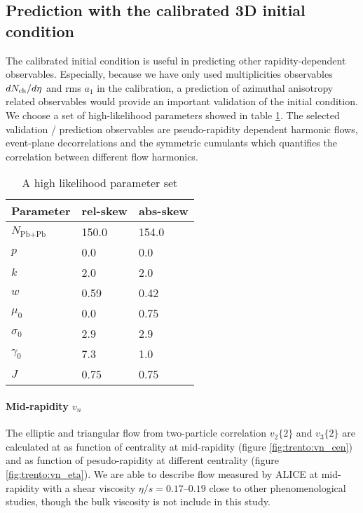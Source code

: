 \subsection{Prediction with the calibrated 3D initial condition}
The calibrated initial condition is useful in predicting other rapidity-dependent observables.
Especially, because we have only used multiplicities observables $dN_\text{ch}/d\eta$ and rms $a_1$ in the calibration, a prediction of azimuthal anisotropy related observables would provide an important validation of the initial condition.
We choose a set of high-likelihood parameters showed in table \ref{tab:chosen_parameters}.
The selected validation / prediction observables are pseudo-rapidity dependent harmonic flows, event-plane decorrelations and the symmetric cumulants which quantifies the correlation between different flow harmonics.

\begin{table}
\centering
\caption{A high likelihood parameter set}
\begin{tabular}{lll}
\hline
Parameter & rel-skew	& abs-skew \\
\hline
$N_{\textrm{Pb+Pb}}$   & 150.0     & 154.0  \\
$p$	    & 0.0      & 0.0  \\
$k$	    & 2.0     & 2.0  \\
$w$	    & 0.59     & 0.42  \\
$\mu_0$   & 0.0     & 0.75  \\
$\sigma_0$ & 2.9    & 2.9  \\
$\gamma_0$ & 7.3		& 1.0	\\
$J$	     & 0.75 & 0.75	\\
\hline
\end{tabular}
\label{tab:chosen_parameters}    
\end{table}

\paragraph{Mid-rapidity $v_n$} The elliptic and triangular flow from two-particle correlation $v_2\{2\}$ and $v_3\{2\}$ are calculated at as function of centrality at mid-rapidity (figure \ref{fig:trento:vn_cen}) and as function of pesudo-rapidity at different centrality (figure \ref{fig:trento:vn_eta}).
We are able to describe flow measured by ALICE \cite{Adam:2016izf} at mid-rapidity with a shear viscosity $\eta/s = 0.17$--$0.19$ close to other phenomenological studies, though the bulk viscosity is not include in this study.

